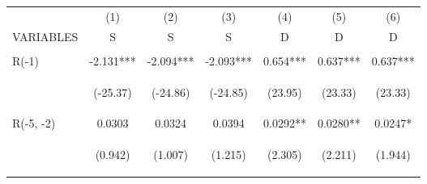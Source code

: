\documentclass[]{article}
\begin{document}
\begin{center}
\begin{tabular}{lcccccc} \hline
 & (1) & (2) & (3) & (4) & (5) & (6) \\
VARIABLES & S & S & S & D & D & D \\ \hline
\vspace{4pt} & \begin{footnotesize}\end{footnotesize} & \begin{footnotesize}\end{footnotesize} & \begin{footnotesize}\end{footnotesize} & \begin{footnotesize}\end{footnotesize} & \begin{footnotesize}\end{footnotesize} & \begin{footnotesize}\end{footnotesize} \\
R(-1) & -2.131*** & -2.094*** & -2.093*** & 0.654*** & 0.637*** & 0.637*** \\
\vspace{4pt} & \begin{footnotesize}(-25.37)\end{footnotesize} & \begin{footnotesize}(-24.86)\end{footnotesize} & \begin{footnotesize}(-24.85)\end{footnotesize} & \begin{footnotesize}(23.95)\end{footnotesize} & \begin{footnotesize}(23.33)\end{footnotesize} & \begin{footnotesize}(23.33)\end{footnotesize} \\
R(-5, -2) & 0.0303 & 0.0324 & 0.0394 & 0.0292** & 0.0280** & 0.0247* \\
\vspace{4pt} & \begin{footnotesize}(0.942)\end{footnotesize} & \begin{footnotesize}(1.007)\end{footnotesize} & \begin{footnotesize}(1.215)\end{footnotesize} & \begin{footnotesize}(2.305)\end{footnotesize} & \begin{footnotesize}(2.211)\end{footnotesize} & \begin{footnotesize}(1.944)\end{footnotesize} \\

\end{tabular}
\end{center}
\end{document}
